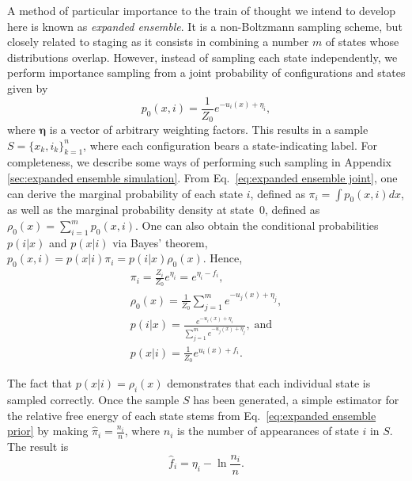 \documentclass[aip,jcp,reprint,amsmath,amssymb]{revtex4-1}
\newcommand{\vt}[1]{\boldsymbol{\mathbf{#1}}}           %
\begin{document}
A method of particular importance to the train of thought we intend to develop here is known as \textit{expanded ensemble}.\cite{Lyubartsev_1992} It is a non-Boltzmann sampling scheme, but closely related to staging as it consists in combining a number $m$ of states whose distributions overlap. However, instead of sampling each state independently, we perform importance sampling from a joint probability of configurations and states given by\cite{Nymeyer_2010}
\begin{equation}
\label{eq:expanded ensemble joint}
p_0(x, i) = \frac{1}{Z_0} e^{-u_i(x) + \eta_i},
\end{equation}
where $\vt \eta$ is a vector of arbitrary weighting factors. This results in a sample $S = \{x_k,i_k\}_{k=1}^n$, where each configuration bears a state-indicating label. For completeness, we describe some ways of performing such sampling in Appendix \ref{sec:expanded ensemble simulation}. From Eq.~\eqref{eq:expanded ensemble joint}, one can derive the marginal probability of each state $i$, defined as $\pi_i = \int p_0(x,i)dx$, as well as the marginal probability density at state~$0$, defined as $\rho_0(x) = \sum_{i=1}^m p_0(x,i)$. One can also obtain the conditional probabilities $p(i|x)$ and $p(x|i)$ via Bayes' theorem, $p_0(x,i) = p(x|i) \pi_i = p(i|x) \rho_0(x)$. Hence,
\begin{subequations}
\label{eq:expanded ensemble probabilities}
\begin{gather}
\pi_i = \frac{Z_i}{Z_0} e^{\eta_i} = e^{\eta_i - f_i}, \label{eq:expanded ensemble prior} \\
\rho_0(x) = \frac{1}{Z_0} \sum_{j=1}^m e^{-u_j(x) + \eta_j}, \label{eq:expanded ensemble evidence} \\
p(i|x) = \frac{e^{-u_i(x) + \eta_i}}{\sum_{j=1}^m e^{-u_j(x) + \eta_j}}, \; \text{and} \label{eq:expanded ensemble posterior} \\
p(x|i) = \frac{1}{Z_0} e^{u_i(x) + f_i}. \label{eq:expanded ensemble likelihood}
\end{gather}
\end{subequations}

The fact that $p(x|i) = \rho_i(x)$ demonstrates that each individual state is sampled correctly. Once the sample $S$ has been generated, a simple estimator for the relative free energy of each state stems from Eq.~\eqref{eq:expanded ensemble prior} by making $\hat \pi_i = \frac{n_i}{n}$, where $n_i$ is the number of appearances of state $i$ in $S$. The result is
\begin{equation}
\label{eq:expanded ensemble histogram estimator}
\hat f_i = \eta_i - \ln \frac{n_i}{n}.
\end{equation}
\end{document}

